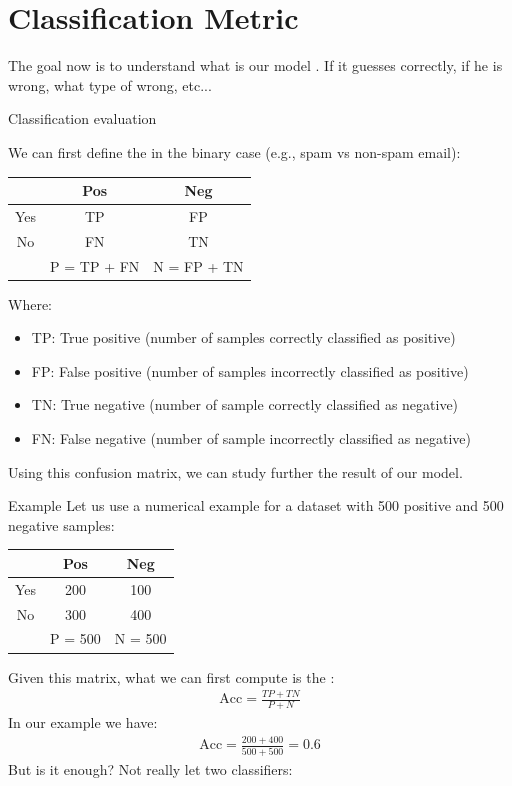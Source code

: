 \section{Classification Metric}
The goal now is to understand what is our model . If it guesses correctly, if he is wrong, what type of wrong, etc...

\begin{parag}{Classification evaluation}
	\begin{definition}
	
	We can first define the  in the binary case (e.g., spam vs non-spam email):
	 \begin{center}
	 \begin{tabular}{|c|c|c|}
		\hline
	 	& Pos & Neg  \\
		\hline
		\hline
	 	Yes & TP & FP \\
		\hline
	 	No & FN & TN \\
		\hline
	 	   & P = TP + FN & N = FP + TN \\
		\hline
	 \end{tabular}
	 \end{center}
	 Where:
	 \begin{itemize}
	     \item TP: True positive (number of samples correctly classified as positive)
	     \item FP: False positive (number of samples incorrectly classified as positive)
	     \item TN: True negative (number of sample correctly classified as negative)
	     \item FN: False negative (number of sample incorrectly classified as negative)
	 \end{itemize}
	\end{definition}
	 Using this confusion matrix, we can study further the result of our model.
\end{parag}
\begin{parag}{Example}
    Let us use a numerical example for a dataset with 500 positive and 500 negative samples:

	 \begin{center}
	 \begin{tabular}{|c|c|c|}
		\hline
	 	& Pos & Neg  \\
		\hline
		\hline
	 	Yes & 200 & 100 \\
		\hline
	 	No & 300 & 400 \\
		\hline
	 	   & P =  500 & N = 500 \\
		\hline
	 \end{tabular}
	 \end{center}
	 Given this matrix, what we can first compute is the :
	 \begin{align*} 
		 \text{Acc} = \frac{TP + TN}{P + N}
	 \end{align*}
	 In our example we have:
	 \begin{align*} 
		 \text{Acc} = \frac{200 + 400}{500 + 500} = 0.6
	 \end{align*}
	 But is it enough? Not really let two classifiers:
\end{parag}
